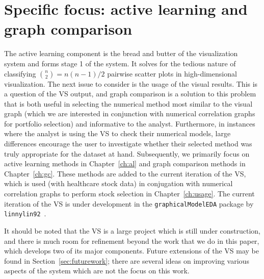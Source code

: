 \section{Specific focus: active learning and graph comparison}
\label{sec:visualizer:focus}

The active learning component is the bread and butter of the visualization 
system and forms stage 1 of the system. It solves for the 
tedious nature of classifying ${n \choose 2}=n(n-1)/2$ pairwise scatter plots 
in high-dimensional visualization. 
The next issue to consider is the usage of the visual results. This is a 
question of the VS output, and graph comparison is a solution to this problem 
that is both useful in selecting the numerical method most similar to the 
visual graph (which we are interested in conjunction with numerical correlation 
graphs for portfolio selection) and informative to the analyst. Furthermore, in 
instances where the analyst is using the VS to check their numerical models, 
large differences encourage the user to investigate whether their selected 
method was truly appropriate for the dataset at hand. 
Subsequently, 
we primarily focus on active learning methods in Chapter~\ref{ch:al} and graph 
comparison methods in Chapter~\ref{ch:gc}. These methods are added to the 
current iteration of the VS, which is used (with healthcare stock data) 
in conjugation with numerical correlation graphs to perform stock selection in 
Chapter~\ref{ch:usage}. The current iteration of the VS is under development in 
the \texttt{graphicalModelEDA} package by \texttt{linnylin92}~\cite{lin2017}.

It should be noted that the VS is a large project which is still under 
construction, and there is much room for 
refinement beyond the work that we do in this paper, which develops two of its 
major components. Future extensions of the VS may be found in 
Section~\ref{sec:futurework}; there are several ideas on improving various 
aspects of the system which are not the focus on this work.